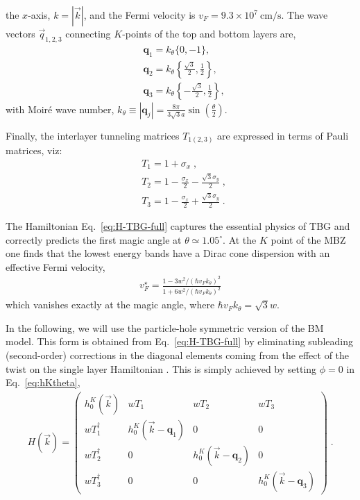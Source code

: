 the $x$-axis, $k=|\vec{k}|$, and the Fermi velocity is $v_F=9.3 \times 10^7 \mathrm{~cm} / \mathrm{s}$. The wave vectors $\vec{q}_{1,2,3}$ connecting $K$-points of the top and bottom layers are,
\begin{subequations}
	\begin{align}
		&\mathbf{q}_1=k_\theta\{0,-1\}, \\
		&\mathbf{q}_2=k_\theta\left\{\frac{\sqrt{3}}{2}, \frac{1}{2}\right\}, \\
		&\mathbf{q}_3=k_\theta\left\{-\frac{\sqrt{3}}{2}, \frac{1}{2}\right\},
	\end{align} 
\end{subequations}
with Moir\'{e} wave number, $k_\theta \equiv |\mathbf{q}_j|=\frac{8 \pi}{3 \sqrt{3} a} \sin \left(\frac{\theta}{2}\right)$.

Finally, the interlayer tunneling matrices $T_{1(2,3)}$ are expressed in terms of Pauli matrices, viz:
\begin{subequations}
	\begin{align}
		&T_1=1+\sigma_x \;,\\
		&T_2=1-\frac{\sigma_x}{2}-\frac{\sqrt{3}\sigma_y}{2} \;,\\
		&T_3=1-\frac{\sigma_x}{2} +\frac{\sqrt{3}\sigma_y}{2}  \;.
	\end{align}
\end{subequations}

The Hamiltonian Eq.~\eqref{eq:H-TBG-full} captures the essential physics of TBG and correctly predicts the first magic angle at $\theta\simeq 1.05^{\circ}$. At the $K$ point of the MBZ one finds that the lowest energy bands have a Dirac cone dispersion with an effective Fermi velocity,
\begin{align}
	v_F^{\star}=\frac{1-3 w^2 /\left(\hbar v_F k_\theta\right)^2}{1+6 w^2 /\left(\hbar v_F k_\theta\right)^2}
\end{align}
which vanishes exactly at the magic angle, where $\hbar v_F k_\theta=\sqrt{3} w$.

In the following, we will use the particle-hole symmetric version of the BM model. This form is obtained from Eq.~\eqref{eq:H-TBG-full} by eliminating subleading (second-order) corrections in the diagonal elements coming from the effect of the twist on the single layer Hamiltonian \cite{Bernevig2019PRL-TBG}. This is simply achieved by setting $\phi=0$ in Eq.~\eqref{eq:hKtheta},
\begin{align}
	\label{eq:H-TBG-symmetric}
	H(\vec{k})=\left(\begin{array}{cccc}
		h_0^{K}(\vec{k}) & w T_1 & w T_2 & w T_3 \\
		w T_1^{\dagger} & h_0^{K}(\vec{k}-\mathbf{q}_1) & 0 & 0 \\
		w T_2^{\dagger} & 0 & h_0^{K}(\vec{k}-\mathbf{q}_2) & 0 \\
		w T_3^{\dagger} & 0 & 0 & h_0^{K}(\vec{k}-\mathbf{q}_3)
	\end{array}\right)\;.
\end{align}

